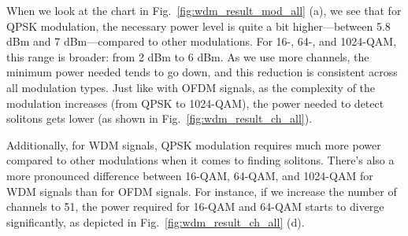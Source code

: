 When we look at the chart in Fig.~\ref{fig:wdm_result_mod_all} (a), we see that for QPSK modulation, the necessary power level is quite a bit higher—between 5.8 dBm and 7 dBm—compared to other modulations. For 16-, 64-, and 1024-QAM, this range is broader: from 2 dBm to 6 dBm. As we use more channels, the minimum power needed tends to go down, and this reduction is consistent across all modulation types. Just like with OFDM signals, as the complexity of the modulation increases (from QPSK to 1024-QAM), the power needed to detect solitons gets lower (as shown in Fig.~\ref{fig:wdm_result_ch_all}).

Additionally, for WDM signals, QPSK modulation requires much more power compared to other modulations when it comes to finding solitons. There's also a more pronounced difference between 16-QAM, 64-QAM, and 1024-QAM for WDM signals than for OFDM signals. For instance, if we increase the number of channels to 51, the power required for 16-QAM and 64-QAM starts to diverge significantly, as depicted in Fig.~\ref{fig:wdm_result_ch_all} (d).

